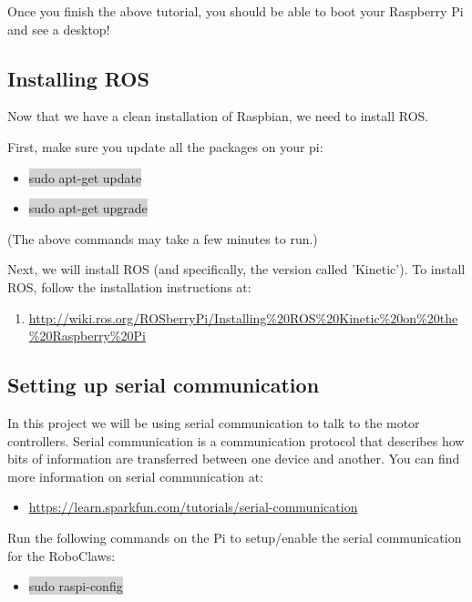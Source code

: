 \documentclass[12pt]{article}
\begin{document}
Once you finish the above tutorial, you should be able to boot your Raspberry Pi and see a desktop!

\subsection{Installing ROS}
Now that we have a clean installation of Raspbian, we need to install ROS.

First, make sure you update all the packages on your pi:
\begin{itemize}
	\item[] \colorbox{lightgray}{sudo apt-get update}
	\item[] \colorbox{lightgray}{sudo apt-get upgrade}
\end{itemize} 
(The above commands may take a few minutes to run.)

Next, we will install ROS (and specifically, the version called 'Kinetic').  To install ROS, follow the installation instructions at:
\begin{enumerate}
	\item[] \href{http://wiki.ros.org/ROSberryPi/Installing%20ROS%20Kinetic%20on%20the%20Raspberry%20Pi}{http://wiki.ros.org/ROSberryPi/Installing\%20ROS\%20Kinetic\%20on\%20the\%20Raspberry\%20Pi}
\end{enumerate}

\subsection{Setting up serial communication}	

In this project we will be using serial communication to talk to the motor controllers. Serial communication is a communication protocol that describes how bits of information are transferred between one device and another. You can find more information on serial communication at:
\begin{itemize}
	\item \href{https://learn.sparkfun.com/tutorials/serial-communication}{https://learn.sparkfun.com/tutorials/serial-communication}
\end{itemize}

\noindent Run the following commands on the Pi to setup/enable the serial communication for the RoboClaws:
\begin{itemize}
	\item[] \colorbox{lightgray}{sudo raspi-config}
\end{itemize}
\end{document}
